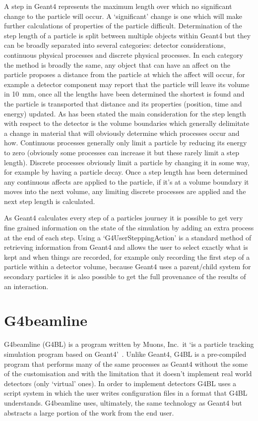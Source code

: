 A step in Geant4 represents the maximum length over which no significant change to the particle will occur. A `significant' change is one which will make further calculations of properties of the particle difficult. Determination of the step length of a particle is split between multiple objects within Geant4 but they can be broadly separated into several categories: detector considerations, continuous physical processes and discrete physical processes. In each category the method is broadly the same, any object that can have an affect on the particle proposes a distance from the particle at which the affect will occur, for example a detector component may report that the particle will leave its volume in 10~mm, once all the lengths have been determined the shortest is found and the particle is transported that distance and its properties (position, time and energy) updated. As has been stated the main consideration for the step length with respect to the detector is the volume boundaries which generally delimitate a change in material that will obviously determine which processes occur and how. Continuous processes generally only limit a particle by reducing its energy to zero (obviously some processes can increase it but these rarely limit a step length). Discrete processes obviously limit a particle by changing it in some way, for example by having a particle decay. Once a step length has been determined any continuous affects are applied to the particle, if it's at a volume boundary it moves into the next volume, any limiting discrete processes are applied and the next step length is calculated. 

As Geant4 calculates every step of a particles journey it is possible to get very fine grained information on the state of the simulation by adding an extra process at the end of each step. Using a `G4UserSteppingAction' is a standard method of retrieving information from Geant4 and allows the user to select exactly what is kept and when things are recorded, for example only recording the first step of a particle within a detector volume, because Geant4 uses a parent/child system for secondary particles it is also possible to get the full provenance of the results of an interaction.

\section{G4beamline} %
\label{sec:g4beamline}
G4beamline (G4BL) is a program written by Muons, Inc.\ it `is a particle tracking simulation program based on Geant4'~\cite{G4BL ref}. Unlike Geant4, G4BL is a pre-compiled program that performs many of the same processes as Geant4 without the some of the customisation and with the limitation that it doesn't implement real world detectors (only `virtual' ones). In order to implement detectors G4BL uses a script system in which the user writes configuration files in a format that G4BL understands. G4beamline uses, ultimately, the same technology as Geant4 but abstracts a large portion of the work from the end user.

